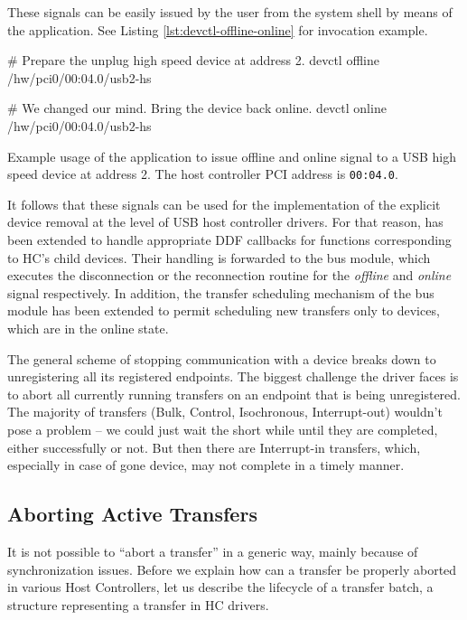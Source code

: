 These signals can be easily issued by the user from the system shell by means
of the  application. See Listing \ref{lst:devctl-offline-online}
for invocation example.

\begin{listing}
	\begin{bdsh}
		# Prepare the unplug high speed device at address 2.
		devctl offline /hw/pci0/00:04.0/usb2-hs

		# We changed our mind. Bring the device back online.
		devctl online /hw/pci0/00:04.0/usb2-hs
	\end{bdsh}
	\caption[Example usage of  to issue offline and online
	signal.]{Example usage of the  application to issue offline and
	online signal to a USB high speed device at address 2. The host controller
	PCI address is \texttt{00:04.0}.}
	\label{lst:devctl-offline-online}
\end{listing}

It follows that these signals can be used for the implementation of the
explicit device removal at the level of USB host controller drivers. For that
reason,  has been extended to handle appropriate DDF callbacks
for functions corresponding to HC's child devices. Their handling is forwarded
to the bus module, which executes the disconnection or the reconnection routine
for the \textit{offline} and \textit{online} signal respectively. In addition,
the transfer scheduling mechanism of the bus module has been extended to permit
scheduling new transfers only to devices, which are in the online state.

The general scheme of stopping communication with a device breaks down to
unregistering all its registered endpoints. The biggest challenge the driver
faces is to abort all currently running transfers on an endpoint that is being
unregistered. The majority of transfers (Bulk, Control, Isochronous,
Interrupt-out) wouldn't pose a problem -- we could just wait the short while
until they are completed, either successfully or not. But then there are
Interrupt-in transfers, which, especially in case of gone device, may not
complete in a timely manner.

\subsection{Aborting Active Transfers}
\label{sec:aborting-transfers}

It is not possible to ``abort a transfer'' in a generic way, mainly because of
synchronization issues. Before we explain how can a transfer be properly
aborted in various Host Controllers, let us describe the lifecycle of
a transfer batch, a structure representing a transfer in HC drivers.

